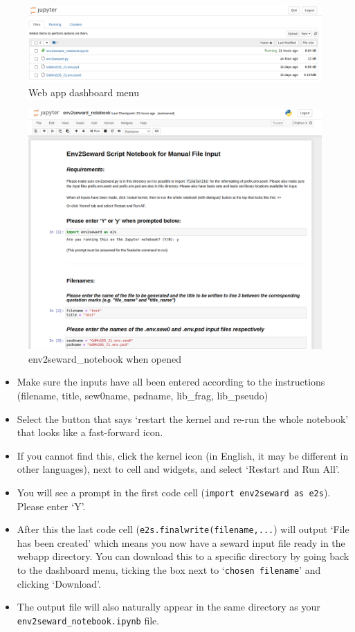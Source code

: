 \documentclass[10pt]{article}
\begin{document}
\begin{figure}
	\centering
	\includegraphics[width=1.3\linewidth]{dashboard.png}
	\caption{Web app dashboard menu}
	\label{fig:screenshot-from-2020-06-23-12-26-13}
\end{figure}

\begin{figure}
	\centering
	\includegraphics[width=1.3\linewidth]{notebook.png}
	\caption{env2seward\_notebook when opened}
	\label{fig:screenshot-from-2020-06-23-12-26-25}
\end{figure}



\begin{itemize}
	\item Make sure the inputs have all been entered according to the instructions (filename, title, sew0name, psdname, lib\_frag, lib\_pseudo)
	\item Select the button that says `restart the kernel and re-run the whole notebook' that looks like a fast-forward icon.
	\item If you cannot find this, click the kernel icon (in English, it may be different in other languages), next to cell and widgets, and select `Restart and Run All'.
	\item You will see a prompt in the first code cell (\texttt{import env2seward as e2s}). Please enter `Y'.
	\item After this the last code cell (\texttt{e2s.finalwrite(filename,...}) will output `File has been created' which means you now have a seward input file ready in the webapp directory. You can download this to a specific directory by going back to the dashboard menu, ticking the box next to `\texttt{chosen filename}' and clicking `Download'.
	\item The output file will also naturally appear in the same directory as your \texttt{env2seward\_notebook.ipynb} file.
\end{itemize}
\end{document}
